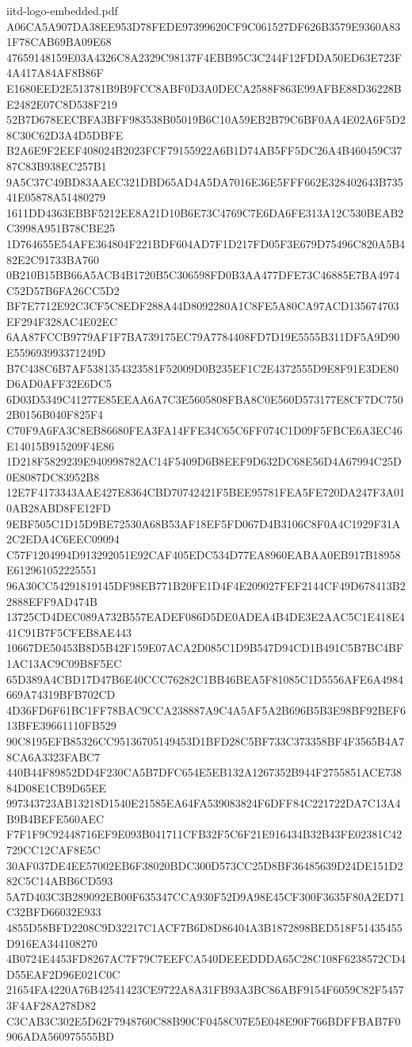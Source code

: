 \begin{filecontents*}[overwrite]{iitd-logo-embedded.pdf}
A06CA5A907DA38EE953D78FEDE97399620CF9C061527DF626B3579E9360A831F78CAB69BA09E68
47659148159E03A4326C8A2329C98137F4EBB95C3C244F12FDDA50ED63E723F4A417A84AF8B86F
E1680EED2E513781B9B9FCC8ABF0D3A0DECA2588F863E99AFBE88D36228BE2482E07C8D538F219
52B7D678EECBFA3BFF983538B05019B6C10A59EB2B79C6BF0AA4E02A6F5D28C30C62D3A4D5DBFE
B2A6E9F2EEF408024B2023FCF79155922A6B1D74AB5FF5DC26A4B460459C3787C83B938EC257B1
9A5C37C49BD83AAEC321DBD65AD4A5DA7016E36E5FFF662E328402643B73541E05878A51480279
1611DD4363EBBF5212EE8A21D10B6E73C4769C7E6DA6FE313A12C530BEAB2C3998A951B78CBE25
1D764655E54AFE364804F221BDF604AD7F1D217FD05F3E679D75496C820A5B482E2C91733BA760
0B210B15BB66A5ACB4B1720B5C306598FD0B3AA477DFE73C46885E7BA4974C52D57B6FA26CC5D2
BF7E7712E92C3CF5C8EDF288A44D8092280A1C8FE5A80CA97ACD135674703EF294F328AC4E02EC
6AA87FCCB9779AF1F7BA739175EC79A7784408FD7D19E5555B311DF5A9D90E559693993371249D
B7C438C6B7AF5381354323581F52009D0B235EF1C2E4372555D9E8F91E3DE80D6AD0AFF32E6DC5
6D03D5349C41277E85EEAA6A7C3E5605808FBA8C0E560D573177E8CF7DC7502B0156B040F825F4
C70F9A6FA3C8EB86680FEA3FA14FFE34C65C6FF074C1D09F5FBCE6A3EC46E14015B915209F4E86
1D218F5829239E940998782AC14F5409D6B8EEF9D632DC68E56D4A67994C25D0E8087DC83952B8
12E7F4173343AAE427E8364CBD70742421F5BEE95781FEA5FE720DA247F3A010AB28ABD8FE12FD
9EBF505C1D15D9BE72530A68B53AF18EF5FD067D4B3106C8F0A4C1929F31A2C2EDA4C6EEC09094
C57F1204994D913292051E92CAF405EDC534D77EA8960EABAA0EB917B18958E612961052225551
96A30CC54291819145DF98EB771B20FE1D4F4E209027FEF2144CF49D678413B22888EFF9AD474B
13725CD4DEC089A732B557EADEF086D5DE0ADEA4B4DE3E2AAC5C1E418E441C91B7F5CFEB8AE443
10667DE50453B8D5B42F159E07ACA2D085C1D9B547D94CD1B491C5B7BC4BF1AC13AC9C09B8F5EC
65D389A4CBD17D47B6E40CCC76282C1BB46BEA5F81085C1D5556AFE6A4984669A74319BFB702CD
4D36FD6F61BC1FF78BAC9CCA238887A9C4A5AF5A2B696B5B3E98BF92BEF613BFE39661110FB529
90C8195EFB85326CC95136705149453D1BFD28C5BF733C373358BF4F3565B4A78CA6A3323FABC7
440B44F89852DD4F230CA5B7DFC654E5EB132A1267352B944F2755851ACE73884D08E1CB9D65EE
997343723AB13218D1540E21585EA64FA539083824F6DFF84C221722DA7C13A4B9B4BEFE560AEC
F7F1F9C92448716EF9E093B041711CFB32F5C6F21E916434B32B43FE02381C42729CC12CAF8E5C
30AF037DE4EE57002EB6F38020BDC300D573CC25D8BF36485639D24DE151D282C5C14ABB6CD593
5A7D403C3B289092EB00F635347CCA930F52D9A98E45CF300F3635F80A2ED71C32BFD66032E933
4855D58BFD2208C9D32217C1ACF7B6D8D86404A3B1872898BED518F51435455D916EA344108270
4B0724E4453FD8267AC7F79C7EEFCA540DEEEDDDA65C28C108F6238572CD4D55EAF2D96E021C0C
21654FA4220A76B42541423CE9722A8A31FB93A3BC86ABF9154F6059C82F54573F4AF28A278D82
C3CAB3C302E5D62F7948760C88B90CF0458C07E5E048E90F766BDFFBAB7F0906ADA560975555BD

\end{filecontents*}
